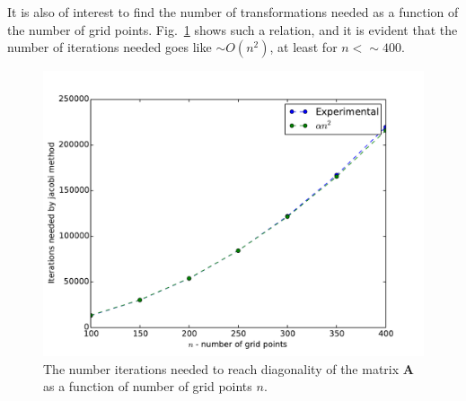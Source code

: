 \documentclass[11pt, a4paper]{article}
\newcommand{\A}{\mathbf{A}}
\begin{document}
			It is also of interest to find the number of transformations needed as a function of the number of grid points. Fig.~\ref{fig: number of iterations vs number og grid points} shows such a relation, and it is evident that the number of iterations needed goes like $\sim O(n^2)$, at least for $n<\sim400$. 
				\begin{figure}
					\centering
					\includegraphics[scale=0.7, clip=true, trim= 0 0 0 0]{plot-grid-pointsVSiterations}
					\caption{The number iterations needed to reach diagonality of the matrix $\A$ as a function of number of grid points $n$.}
					\label{fig: number of iterations vs number og grid points}
				\end{figure}
				
		
\end{document}
